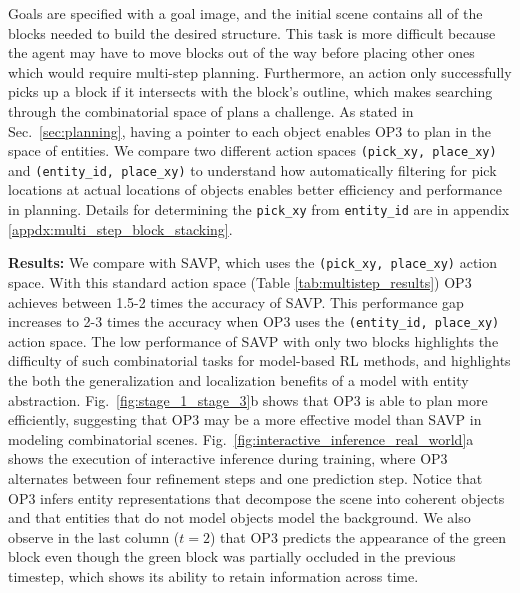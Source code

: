 Goals are specified with a goal image, and the initial scene contains all of the blocks needed to build the desired structure. This task is more difficult because the agent may have to move blocks out of the way before placing other ones which would require multi-step planning. Furthermore, an action only successfully picks up a block if it intersects with the block's outline, which makes searching through the combinatorial space of plans a challenge. As stated in Sec.~\ref{sec:planning}, having a pointer to each object enables OP3 to plan in the space of entities.
We compare two different action spaces \texttt{(pick\_xy, place\_xy)} and \texttt{(entity\_id, place\_xy)} to understand how automatically filtering for pick locations at actual locations of objects enables better efficiency and  performance in planning.
Details for determining the \texttt{pick\_xy} from \texttt{entity\_id} are in appendix \ref{appdx:multi_step_block_stacking}.

\textbf{Results:} We compare with SAVP, which uses the \texttt{(pick\_xy, place\_xy)} action space.
With this standard action space (Table \ref{tab:multistep_results}) OP3 achieves between 1.5-2 times the accuracy of SAVP. This performance gap increases to 2-3 times the accuracy when OP3 uses the \texttt{(entity\_id, place\_xy)} action space.
The low performance of SAVP with only two blocks highlights the difficulty of such combinatorial tasks for model-based RL methods, and highlights the both the generalization and localization benefits of a model with entity abstraction.
Fig.~\ref{fig:stage_1_stage_3}b shows that OP3 is able to plan more efficiently, suggesting that OP3 may be a more effective model than SAVP in modeling combinatorial scenes.
Fig.~\ref{fig:interactive_inference_real_world}a shows the execution of interactive inference during training, where OP3 alternates between four refinement steps and one prediction step.
Notice that OP3 infers entity representations that decompose the scene into coherent objects and that entities that do not model objects model the background.
We also observe in the last column ($t=2$) that OP3 predicts the appearance of the green block even though the green block was partially occluded in the previous timestep, which shows its ability to retain information across time.



